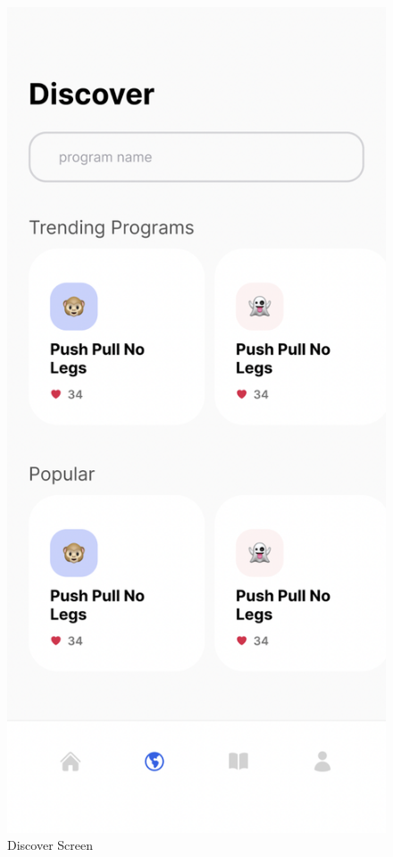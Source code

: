 \documentclass[12pt, titlepage]{article}
\begin{document}
  \begin{figure}[H]
		\centering
		\includegraphics[scale=0.35]{discover_screen}
		\caption{Discover Screen}
	\end{figure}
\end{document}
